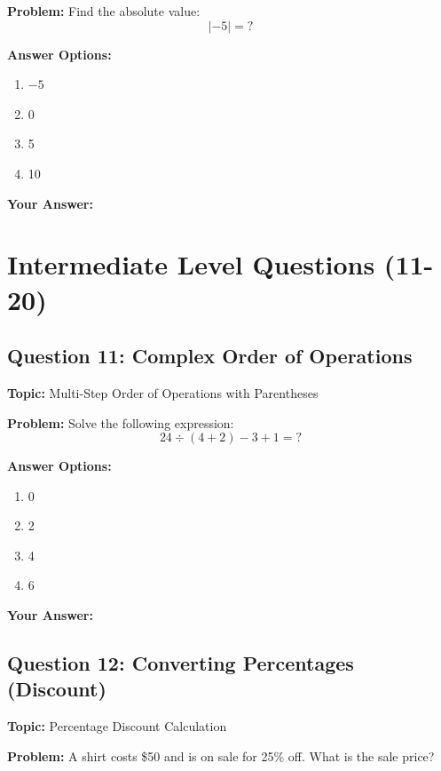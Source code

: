 \documentclass[12pt]{article}
\begin{document}
\textbf{Problem:} Find the absolute value:
\[|-5| = ?\]

\textbf{Answer Options:}
\begin{enumerate}[label=\Alph*)]
    \item $-5$
    \item 0
    \item 5
    \item 10
\end{enumerate}

\noindent\textbf{Your Answer:} \underline{\hspace{2cm}}

\newpage

\section{Intermediate Level Questions (11-20)}

\subsection{Question 11: Complex Order of Operations}
\textbf{Topic:} Multi-Step Order of Operations with Parentheses

\textbf{Problem:} Solve the following expression:
\[24 \div (4 + 2) - 3 + 1 = ?\]

\textbf{Answer Options:}
\begin{enumerate}[label=\Alph*)]
    \item 0
    \item 2
    \item 4
    \item 6
\end{enumerate}

\noindent\textbf{Your Answer:} \underline{\hspace{2cm}}

\vspace{0.5cm}


\subsection{Question 12: Converting Percentages (Discount)}
\textbf{Topic:} Percentage Discount Calculation

\textbf{Problem:} A shirt costs \$50 and is on sale for 25\% off. What is the sale price?
\end{document}

